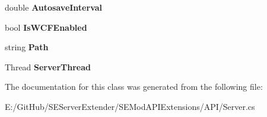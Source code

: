 \begin{DoxyCompactItemize}
\item 
\hypertarget{class_s_e_mod_a_p_i_extensions_1_1_a_p_i_1_1_server_a259ac060ed6800d31d5555a7808865cb}{}double {\bfseries Autosave\+Interval}\label{class_s_e_mod_a_p_i_extensions_1_1_a_p_i_1_1_server_a259ac060ed6800d31d5555a7808865cb}

\item 
\hypertarget{class_s_e_mod_a_p_i_extensions_1_1_a_p_i_1_1_server_a37b607c2aa87e8b70296b6693cd3bee9}{}bool {\bfseries Is\+W\+C\+F\+Enabled}\label{class_s_e_mod_a_p_i_extensions_1_1_a_p_i_1_1_server_a37b607c2aa87e8b70296b6693cd3bee9}

\item 
\hypertarget{class_s_e_mod_a_p_i_extensions_1_1_a_p_i_1_1_server_a9e2bf6ad33ca6720a814893e8af101a1}{}string {\bfseries Path}\label{class_s_e_mod_a_p_i_extensions_1_1_a_p_i_1_1_server_a9e2bf6ad33ca6720a814893e8af101a1}

\item 
\hypertarget{class_s_e_mod_a_p_i_extensions_1_1_a_p_i_1_1_server_a19685e617c0171fca477a6887fa86d90}{}Thread {\bfseries Server\+Thread}\label{class_s_e_mod_a_p_i_extensions_1_1_a_p_i_1_1_server_a19685e617c0171fca477a6887fa86d90}

\end{DoxyCompactItemize}


The documentation for this class was generated from the following file\+:\begin{DoxyCompactItemize}
\item 
E\+:/\+Git\+Hub/\+S\+E\+Server\+Extender/\+S\+E\+Mod\+A\+P\+I\+Extensions/\+A\+P\+I/Server.\+cs\end{DoxyCompactItemize}

